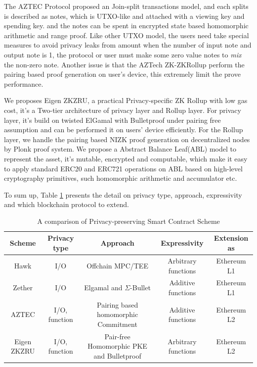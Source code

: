 \documentclass{article}
\begin{document}


The AZTEC Protocol \cite{williamson2018aztec} proposed an Join-split transactions model, and each splits is described as notes, which is UTXO-like and attached with a viewing key and spending key. and the notes can be spent in encrypted state based homomorphic arithmetic and range proof. Like other UTXO model, the users need take special measures to avoid privacy leaks from amount when the number of input note and output note is 1, the protocol or user must make some zero value notes to \textit{mix} the non-zero note. Another issue is that the AZTech ZK-ZKRollup perform the pairing based proof generation on user's device, this extremely limit the prove performance. 

We proposes Eigen ZKZRU, a practical Privacy-specific ZK Rollup with low gas cost, it's a Two-tier architecture of privacy layer and Rollup layer. For privacy layer, it's build on twisted ElGamal with Bulletproof under pairing free assumption and can be performed it on users' device efficiently. For the Rollup layer, we handle the pairing based NIZK proof generation on decentralized nodes by Plonk proof system. We propose a Abstract Balance Leaf(ABL) model to represent the asset, it's mutable, encrypted and computable, which make it easy to apply standard ERC20 and ERC721 operations on ABL based on high-level cryptography primitives, such homomorphic arithmetic and accumulator etc.

To sum up, Table \ref{tab:compare} presents the detail on privacy type, approach, expressivity and which blockchain protocol to extend.  

\begin{table}
\resizebox{\textwidth}{!} {
\begin{tabular}{c|c|c|c|c}
Scheme & Privacy type & Approach & Expressivity & Extension as \\\hline
Hawk & I/O & Offchain MPC/TEE & Arbitrary functions & Ethereum L1 \\
Zether & I/O & Elgamal and $\Sigma$-Bullet & Additive functions & Ethereum L1\\
AZTEC & I/O, function & Pairing based homomorphic Commitment & Additive functions & Ethereum L2\\
Eigen ZKZRU & I/O, function & Pair-free Homomorphic PKE and Bulletproof & Arbitrary functions & Ethereum L2
\end{tabular}
}
\caption{\label{tab:compare}A comparison of Privacy-preserving Smart Contract Scheme}
\end{table}
\end{document}

